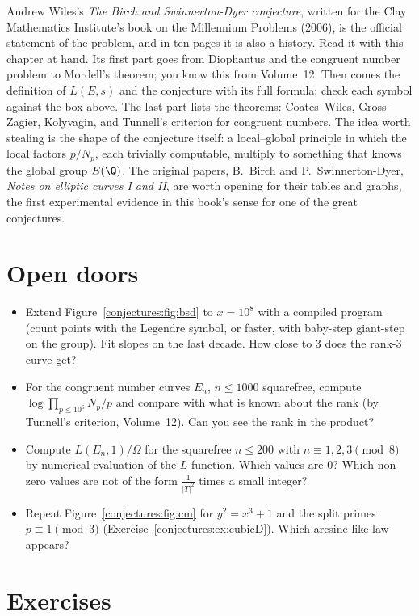 Andrew Wiles's \emph{The Birch and Swinnerton-Dyer conjecture}, written for the Clay Mathematics Institute's book on the Millennium Problems (2006), is the
official statement of the problem, and in ten pages it is also a history. Read it with this chapter at hand. Its first part goes from Diophantus and the
congruent number problem to Mordell's theorem; you know this from Volume~12. Then comes the definition of $L(E,s)$ and the conjecture with its full formula; check
each symbol against the box above. The last part lists the theorems: Coates--Wiles, Gross--Zagier, Kolyvagin, and Tunnell's criterion for congruent numbers.
The idea worth stealing is the shape of the conjecture itself: a local--global principle in which the local factors $p/N_p$, each trivially computable,
multiply to something that knows the global group $E(\Q)$. The original papers, B.~Birch and P.~Swinnerton-Dyer, \emph{Notes on elliptic curves I and II},
are worth opening for their tables and graphs, the first experimental evidence in this book's sense for one of the great conjectures.

\section{Open doors}

\begin{itemize}
\item Extend Figure~\ref{conjectures:fig:bsd} to $x=10^8$ with a compiled program (count points with the Legendre symbol, or faster, with baby-step giant-step on the
group). Fit slopes on the last decade. How close to $3$ does the rank-$3$ curve get?
\item For the congruent number curves $E_n$, $n\le1000$ squarefree, compute $\log\prod_{p\le10^6}N_p/p$ and compare with what is known about the rank (by
Tunnell's criterion, Volume~12). Can you see the rank in the product?
\item Compute $L(E_n,1)/\Omega$ for the squarefree $n\le200$ with $n\equiv1,2,3\pmod8$ by numerical evaluation of the $L$-function. Which values are $0$? Which non-zero values
are not of the form $\frac1{|T|^2}$ times a small integer?
\item Repeat Figure~\ref{conjectures:fig:cm} for $y^2=x^3+1$ and the split primes $p\equiv1\pmod3$ (Exercise~\ref{conjectures:ex:cubicD}). Which arcsine-like law appears?
\end{itemize}

\section{Exercises}

